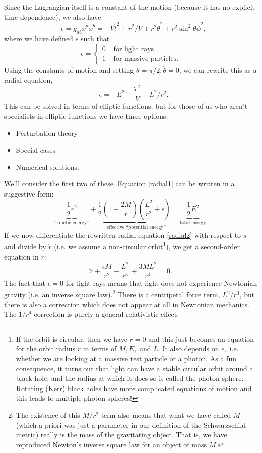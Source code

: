 Since the Lagrangian itself is a constant of the motion (because it has no explicit time dependence), we also have
$$-\epsilon= g_{ab}\dot x^a \dot x^b =-V\dot t^2 +\dot r^2/V + r^2\dot\theta^2 +r^2\sin^2\theta \dot\phi^2,$$
where we have defined $\epsilon$ such that
$$\epsilon=\begin{cases}
0 & \text{ for light rays}\\
1 &\text{ for massive particles}.
\end{cases}$$
Using the constants of motion and setting $\theta=\pi/2,\dot \theta=0$, we can rewrite this as a radial equation,
\begin{equation}\label{radial1}
-\epsilon = -E^2+ \frac{\dot r^2}{V}+L^2/r^2.
\end{equation}
This can be solved in terms of elliptic functions, but for those of us who aren't specialists in elliptic functions we have three options:
\begin{itemize}
    \item Perturbation theory
    \item Special cases
    \item Numerical solutions.
\end{itemize}
%
We'll consider the first two of these. Equation \ref{radial1} can be written in a suggestive form:
\begin{equation}\label{radial2}
\underbrace{\frac{1}{2}\dot r^2}_{\text{``kinetic energy''}} +\frac{1}{2}\underbrace{\left(1-\frac{2M}{r}\right)\left(\frac{L^2}{r^2}+\epsilon\right)}_{\text{effective ``potential energy''}}=\underbrace{\frac{1}{2}E^2}_{\text{total energy}}.
\end{equation}
If we now differentiate the rewritten radial equation \ref{radial2} with respect to $s$ and divide by $\dot r$ (i.e. we assume a non-circular orbit\footnote{If the orbit is circular, then we have $\dot r=0$ and this just becomes an equation for the orbit radius $r$ in terms of $M,E,$ and $L$. It also depends on $\epsilon,$ i.e. whether we are looking at a massive test particle or a photon. As a fun consequence, it turns out that light can have a stable circular orbit around a black hole, and the radius at which it does so is called the photon sphere. Rotating (Kerr) black holes have more complicated equations of motion and this leads to multiple photon spheres!}), we get a second-order equation in $r$:
\begin{equation}\label{radial2ndorder}
\ddot r +\frac{\epsilon M}{r^2}-\frac{L^2}{r^3}+\frac{3ML^2}{r^4}=0.
\end{equation}
The fact that $\epsilon=0$ for light rays means that light does not experience Newtonian gravity (i.e. an inverse square law).\footnote{The existence of this $M/r^2$ term also means that what we have called $M$ (which a priori was just a parameter in our definition of the Schwarzschild metric) really is the mass of the gravitating object. That is, we have reproduced Newton's inverse square law for an object of mass $M$.} There is a centripetal force term, $L^2/r^3$, but there is also a correction which does not appear at all in Newtonian mechanics. The $1/r^4$ correction is purely a general relativistic effect.

